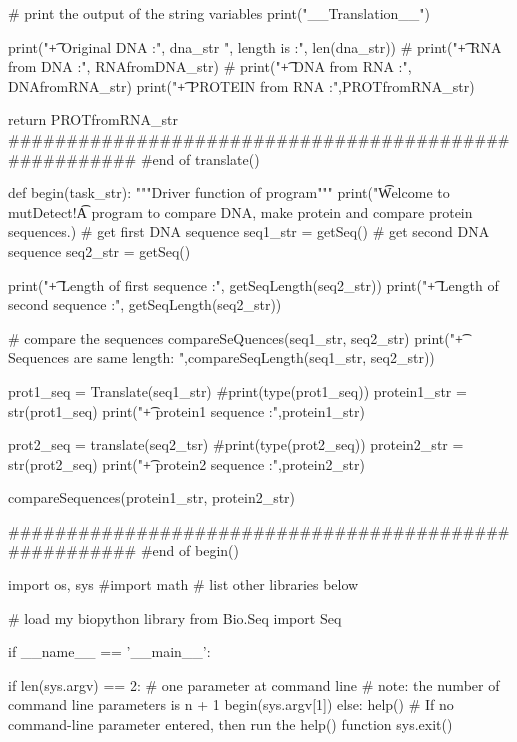     # print the output of the string variables
    print("\n __Translation__")

    print("\t + Original DNA       :", dna_str ", length is :", len(dna_str))
    # print("\t + RNA from DNA     :", RNAfromDNA_str)
    # print("\t + DNA from RNA     :", DNAfromRNA_str)
    print("\t + PROTEIN from RNA   :",PROTfromRNA_str)

    return PROTfromRNA_str
######################################################
#end of translate()



def begin(task_str):
    """Driver function of program"""
    print("\n\t Welcome to mutDetect!\n\t A program to compare DNA, make protein and compare protein sequences.)
# get first DNA sequence
    seq1_str = getSeq()
# get second DNA sequence
    seq2_str = getSeq()

    print("\t + Length of first sequence  :", getSeqLength(seq2_str))
    print("\t + Length of second sequence :", getSeqLength(seq2_str))

# compare the sequences
    compareSeQuences(seq1_str, seq2_str)
    print("\t + Sequences are same length: ",compareSeqLength(seq1_str, seq2_str))

    prot1_seq = Translate(seq1_str)
    #print(type(prot1_seq))
    protein1_str = str(prot1_seq)
    print("\t + protein1 sequence  :",protein1_str)

    prot2_seq = translate(seq2_tsr)
    #print(type(prot2_seq))
    protein2_str = str(prot2_seq)
    print("\t + protein2 sequence  :",protein2_str)

    compareSequences(protein1_str, protein2_str)

######################################################
#end of begin()



import os, sys
#import math
# list other libraries below

# load my biopython library
from Bio.Seq import Seq


if __name__ == '__main__':

        if len(sys.argv) == 2: # one parameter at command line
        # note: the number of command line parameters is n + 1
                begin(sys.argv[1])
        else:
                help() # If no command-line parameter entered, then run the help() function
                sys.exit()




